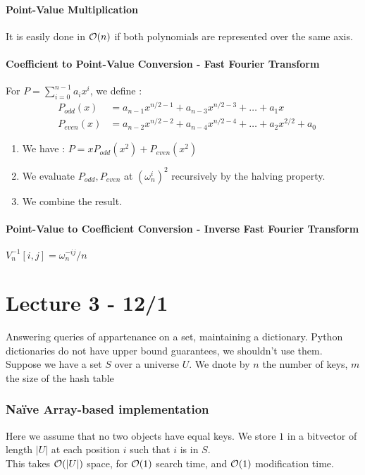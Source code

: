 \documentclass[12pt]{cours}
\begin{document}
\subsection{Point-Value Multiplication}
It is easily done in $\mathcal{O}(n)$ if both polynomials are represented over the same axis.

\subsection{Coefficient to Point-Value Conversion - Fast Fourier Transform}
For $P = \sum_{i = 0}^{n-1} a_{i}x^{i}$, we define : \[
    \begin{aligned}
         & P_{odd}(x)  & = a_{n-1}x^{n/2-1} + a_{n-3}x^{n/2-3} + \ldots + a_{1}x              \\
         & P_{even}(x) & = a_{n-2}x^{n/2-2} + a_{n-4}x^{n/2-4} + \ldots+ a_{2}x^{2/2} + a_{0}
    \end{aligned}
\]
\begin{enumerate}
    \item We have : $P = xP_{odd}(x^{2}) + P_{even}(x^{2})$
    \item We evaluate $P_{odd}, P_{even}$ at $(\omega_{n}^{i})^{2}$ recursively by the halving property.
    \item We combine the result.
\end{enumerate}

\subsection{Point-Value to Coefficient Conversion - Inverse Fast Fourier Transform}
\begin{theorem}
    $V_{n}^{-1}[i, j] = \omega_{n}^{-ij}/n$
\end{theorem}

\part[Hashing]{Lecture 3 - 12/1}
\localtableofcontents

Answering queries of appartenance on a set, maintaining a dictionary. Python dictionaries do not have upper bound guarantees, we shouldn't use them. \\
Suppose we have a set $S$ over a universe $U$. We dnote by $n$ the number of keys, $m$ the size of the hash table

\section{Naïve Array-based implementation}
Here we assume that no two objects have equal keys. We store $1$ in a bitvector of length $|U|$ at each position $i$ such that $i$ is in $S$.\\
This takes $\mathcal{O}(|U|)$ space, for $\mathcal{O}(1)$ search time, and $\mathcal{O}(1)$ modification time.
\end{document}
